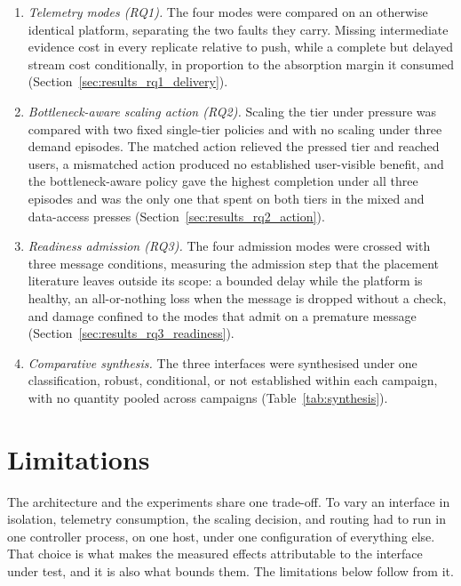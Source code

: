 ﻿\documentclass[12pt,reqno,twoside]{amsbook}
\begin{document}
\begin{enumerate}
    \item \emph{Telemetry modes (RQ1).} The four modes were compared on an
    otherwise identical platform, separating the two faults they carry.
    Missing intermediate evidence cost in every replicate relative to push,
    while a complete but delayed stream cost conditionally, in proportion to
    the absorption margin it consumed
    (Section~\ref{sec:results_rq1_delivery}).

    \item \emph{Bottleneck-aware scaling action (RQ2).} Scaling the tier under
    pressure was compared with two fixed single-tier policies and with no
    scaling under three demand episodes. The matched action relieved the pressed
    tier and reached users, a mismatched action produced no established
    user-visible benefit, and the bottleneck-aware policy gave the highest
    completion under all three episodes and was the only one that spent on both
    tiers in the mixed and data-access presses
    (Section~\ref{sec:results_rq2_action}).

    \item \emph{Readiness admission (RQ3).} The four admission modes were
    crossed with three message conditions, measuring the admission step that
    the placement literature leaves outside its scope: a bounded delay while
    the platform is healthy, an all-or-nothing loss when the message is
    dropped without a check, and damage confined to the modes that admit on a
    premature message (Section~\ref{sec:results_rq3_readiness}).

    \item \emph{Comparative synthesis.} The three interfaces were synthesised
    under one classification, robust, conditional, or not established within
    each campaign, with no quantity pooled across campaigns
    (Table~\ref{tab:synthesis}).
\end{enumerate}

\section{Limitations}\label{sec:limitations}
The architecture and the experiments share one trade-off. To vary an interface
in isolation, telemetry consumption, the scaling decision, and routing had to
run in one controller process, on one host, under one configuration of
everything else. That choice is what makes the measured effects attributable to
the interface under test, and it is also what bounds them. The limitations
below follow from it.
\end{document}
